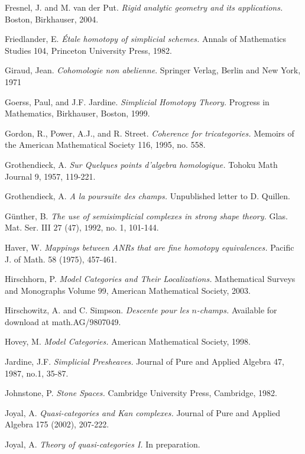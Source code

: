 \documentclass[12pt, final]{report}
\theoremstyle{definition}
\begin{document}
\begin{thebibliography}{99}
 Fresnel, J. and M. van der Put. {\it Rigid analytic geometry and its applications.} Boston, Birkhauser, 2004. 

 Friedlander, E. {\it \'{E}tale homotopy of simplicial schemes.} Annals of Mathematics Studies  104, Princeton University Press, 1982.

 Giraud, Jean. {\it Cohomologie non abelienne}.
Springer Verlag, Berlin and New York, 1971

 Goerss, Paul, and J.F. Jardine. {\it Simplicial Homotopy Theory.} Progress in Mathematics, Birkhauser, Boston, 1999.

 Gordon, R., Power, A.J., and R. Street.
{\it Coherence for tricategories.} Memoirs of the American
Mathematical Society 116, 1995, no. 558.

 Grothendieck, A. {\it Sur Quelques points
d'algebra homologique.} Tohoku Math Journal 9, 1957, 119-221.

 Grothendieck, A. {\it A la poursuite des champs.} Unpublished letter to
D. Quillen.

 G\"{u}nther, B. {\it The use of semisimplicial
complexes in strong shape theory.} Glas. Mat. Ser. III $27$ ($47$), $1992$, no. 1, 101-144.

 Haver, W. {\it Mappings between ANRs that are fine homotopy equivalences.} Pacific J. of Math. 58 (1975), 457-461.

 Hirschhorn, P. {\it Model Categories and Their Localizations.} Mathematical Surveys and Monographs Volume 99, American Mathematical Society, 2003. 

 Hirschowitz, A. and C. Simpson. {\it Descente pour les $n$-champs.} Available for download at math.AG/9807049.

 Hovey, M. {\it Model Categories.} American Mathematical Society, 1998.

 Jardine, J.F. {\it Simplicial Presheaves.} Journal
of Pure and Applied Algebra 47, 1987, no.1, 35-87.

 Johnstone, P. {\it Stone Spaces.}
Cambridge University Press, Cambridge, 1982.

 Joyal, A. {\it Quasi-categories and Kan
complexes.} Journal of Pure and Applied Algebra 175 (2002),
207-222.

 Joyal, A. {\it Theory of quasi-categories I.} In preparation.


\end{thebibliography}
\end{document}
